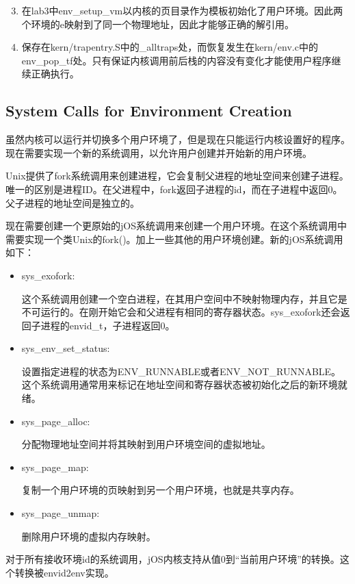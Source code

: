 \begin{answer}
    \begin{enumerate}
        \setcounter{enumi}{2}
        \item 在lab3中env\_setup\_vm以内核的页目录作为模板初始化了用户环境。因此两个环境的e映射到了同一个物理地址，因此才能够正确的解引用。
        \item 保存在kern/trapentry.S中的\_alltraps处，而恢复发生在kern/env.c中的env\_pop\_tf处。只有保证内核调用前后栈的内容没有变化才能使用户程序继续正确执行。
    \end{enumerate}
\end{answer}

\subsection{System Calls for Environment Creation}
\par 虽然内核可以运行并切换多个用户环境了，但是现在只能运行内核设置好的程序。现在需要实现一个新的系统调用，以允许用户创建并开始新的用户环境。
\par Unix提供了fork系统调用来创建进程，它会复制父进程的地址空间来创建子进程。唯一的区别是进程ID。在父进程中，fork返回子进程的id，而在子进程中返回0。父子进程的地址空间是独立的。
\par 现在需要创建一个更原始的jOS系统调用来创建一个用户环境。在这个系统调用中需要实现一个类Unix的fork()。加上一些其他的用户环境创建。新的jOS系统调用如下：
\begin{itemize}
    \item sys\_exofork:
        \par 这个系统调用创建一个空白进程，在其用户空间中不映射物理内存，并且它是不可运行的。在刚开始它会和父进程有相同的寄存器状态。sys\_exofork还会返回子进程的envid\_t，子进程返回0。
    \item sys\_env\_set\_status:
        \par 设置指定进程的状态为ENV\_RUNNABLE或者ENV\_NOT\_RUNNABLE。这个系统调用通常用来标记在地址空间和寄存器状态被初始化之后的新环境就绪。
    \item sys\_page\_alloc:
        \par 分配物理地址空间并将其映射到用户环境空间的虚拟地址。
    \item sys\_page\_map:
        \par 复制一个用户环境的页映射到另一个用户环境，也就是共享内存。
    \item sys\_page\_unmap:
        \par 删除用户环境的虚拟内存映射。
\end{itemize}
\par 对于所有接收环境id的系统调用，jOS内核支持从值0到``当前用户环境''的转换。这个转换被envid2env实现。

